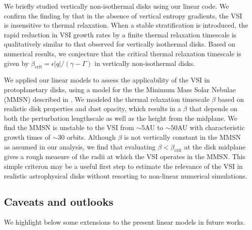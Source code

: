 
We briefly studied vertically non-isothermal disks using our linear 
code. We confirm the finding by \cite{nelson13} that in the absence
of vertical entropy gradients, the VSI is insensitive to
thermal relaxation. When a stable stratification is introduced, the
rapid reduction in VSI growth rates by a finite thermal relaxation
timescale is qualitatively similar to that observed for vertically
isothermal disks. Based on numerical results, we conjecture that the
critical thermal relaxation timescale is given by 
$\beta_\mathrm{crit}=\epsilon|q|/(\gamma-\Gamma)$ in vertically 
non-isothermal disks.  


We applied our linear models to assess the applicability of the VSI in
protoplanetary disks, using a model for the the Minimum Mass Solar Nebulae
(MMSN) described in \cite{chiang10}. We  
modeled the thermal relaxation timescale $\beta$ based on realistic
disk properties and dust opacity, which results in a $\beta$ that
depends on both the perturbation lengthscale as well as the height
from the midplane. We find the MMSN is unstable to the VSI
from $\sim 5$AU to $\sim50$AU with characteristic growth times of
$\sim 30$ orbits. Although $\beta$ is not vertically constant in the
MMSN as assumed in our analysis, we find that evaluating $\beta <
\beta_\mathrm{crit}$ at the disk midplane gives a rough measure of the
radii at which the VSI operates in the MMSN.  This simple criteron may
be a useful first step to estimate the relevance of the VSI in
realistic astrophysical disks without resorting to non-linear
numerical simulations.  



\subsection{Caveats and outlooks} 
We highlight below some extensions to the present  
linear models in future works.  

